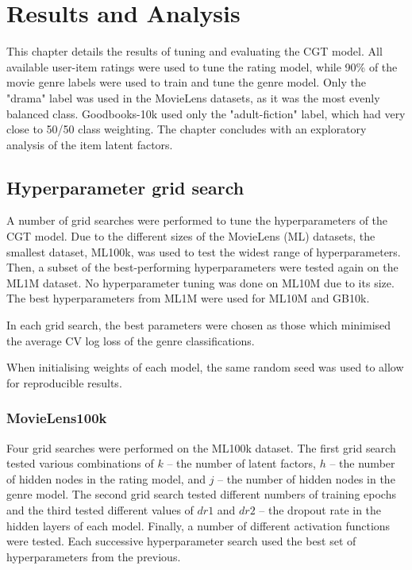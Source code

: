\chapter{Results and Analysis}
\label{results}

This chapter details the results of tuning and evaluating the CGT model. All available user-item ratings were used to tune the rating model, while 90\% of the movie genre labels were used to train and tune the genre model. Only the "drama" label was used in the MovieLens datasets, as it was the most evenly balanced class. Goodbooks-10k used only the "adult-fiction" label, which had very close to 50/50 class weighting. The chapter concludes with an exploratory analysis of the item latent factors.

\section{Hyperparameter grid search}
A number of grid searches were performed to tune the hyperparameters of the CGT model. Due to the different sizes of the MovieLens (ML) datasets, the smallest dataset, ML100k, was used to test the widest range of hyperparameters. Then, a subset of the best-performing hyperparameters were tested again on the ML1M dataset. No hyperparameter tuning was done on ML10M due to its size. The best hyperparameters from ML1M were used for ML10M and GB10k.

In each grid search, the best parameters were chosen as those which minimised the average CV log loss of the genre classifications.

When initialising weights of each model, the same random seed was used to allow for reproducible results.

\subsection{MovieLens100k}
Four grid searches were performed on the ML100k dataset. The first grid search tested various combinations of $k$ -- the number of latent factors, $h$ -- the number of hidden nodes in the rating model, and $j$ -- the number of hidden nodes in the genre model. The second grid search tested different numbers of training epochs and the third tested different values of $dr1$ and $dr2$ -- the dropout rate in the hidden layers of each model. Finally, a number of different activation functions were tested. Each successive hyperparameter search used the best set of hyperparameters from the previous.

